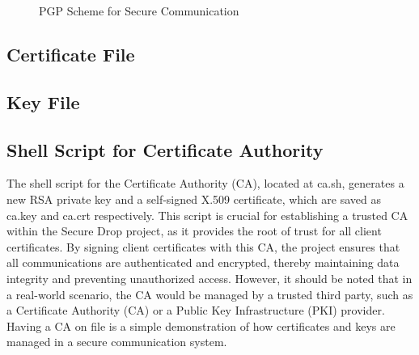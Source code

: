 \documentclass[12pt]{article}
\begin{document}
\begin{figure}[h]
    \centering
    \caption{PGP Scheme for Secure Communication}
    \label{fig:pgp_scheme}
\end{figure}

\subsection{Certificate File}


\subsection{Key File}


\subsection{Shell Script for Certificate Authority}
The shell script for the Certificate Authority (CA), located at ca.sh, generates a new RSA private key and a self-signed X.509 certificate, which are saved as ca.key and ca.crt respectively.
This script is crucial for establishing a trusted CA within the Secure Drop project, as it provides the root of trust for all client certificates.
By signing client certificates with this CA, the project ensures that all communications are authenticated and encrypted, thereby maintaining data integrity and preventing unauthorized access.
However, it should be noted that in a real-world scenario, the CA would be managed by a trusted third party, such as a Certificate Authority (CA) or a Public Key Infrastructure (PKI) provider.
Having a CA on file is a simple demonstration of how certificates and keys are managed in a secure communication system.
\end{document}
